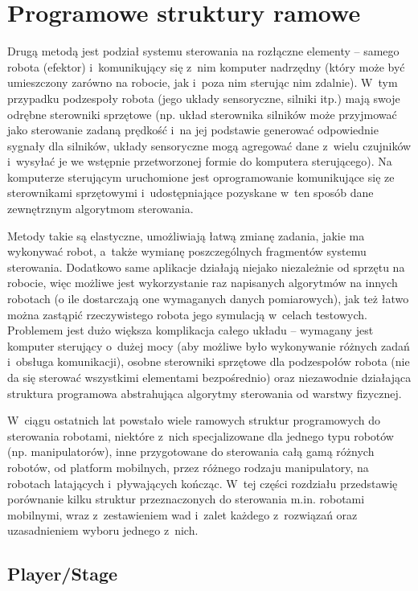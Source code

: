 \section{Programowe struktury ramowe}

Drugą metodą jest podział systemu sterowania na rozłączne elementy -- samego
robota (efektor) i~komunikujący się z~nim komputer nadrzędny (który może być umieszczony
zarówno na robocie, jak i~poza nim sterując nim zdalnie). W~tym przypadku podzespoły
robota (jego układy sensoryczne, silniki itp.) mają swoje odrębne sterowniki sprzętowe
(np. układ sterownika silników może przyjmować jako sterowanie zadaną prędkość
i~na jej podstawie generować odpowiednie sygnały dla silników, układy sensoryczne
mogą agregować dane z~wielu czujników i~wysyłać je we wstępnie przetworzonej formie
do komputera sterującego). Na komputerze sterującym uruchomione jest oprogramowanie
komunikujące się ze sterownikami sprzętowymi i~udostępniające pozyskane w~ten sposób
dane zewnętrznym algorytmom sterowania.

Metody takie są elastyczne, umożliwiają łatwą zmianę zadania, jakie ma wykonywać robot,
a~także wymianę poszczególnych fragmentów systemu sterowania. Dodatkowo same aplikacje
działają niejako niezależnie od sprzętu na robocie, więc możliwe jest wykorzystanie
raz napisanych algorytmów na innych robotach (o ile dostarczają one wymaganych danych
pomiarowych), jak też łatwo można zastąpić rzeczywistego robota jego symulacją w~celach
testowych. Problemem jest dużo większa komplikacja całego układu -- wymagany jest
komputer sterujący o~dużej mocy (aby możliwe było wykonywanie różnych zadań i~obsługa
komunikacji), osobne sterowniki sprzętowe dla podzespołów robota (nie da się sterować
wszystkimi elementami bezpośrednio) oraz niezawodnie działająca struktura programowa
abstrahująca algorytmy sterowania od warstwy fizycznej.

W~ciągu ostatnich lat powstało wiele ramowych struktur programowych do sterowania
robotami, niektóre z~nich specjalizowane dla jednego typu robotów (np. manipulatorów),
inne przygotowane do sterowania całą gamą różnych robotów, od platform mobilnych,
przez różnego rodzaju manipulatory, na robotach latających i~pływających kończąc.
W~tej części rozdziału przedstawię porównanie kilku struktur przeznaczonych do
sterowania m.in. robotami mobilnymi, wraz z~zestawieniem wad i~zalet każdego z~rozwiązań
oraz uzasadnieniem wyboru jednego z~nich.


\subsection{Player/Stage}

